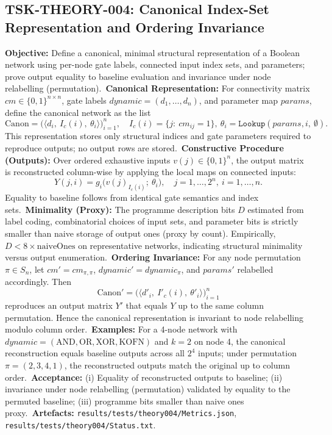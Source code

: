 \documentclass{article}
\begin{document}
\subsection{TSK-THEORY-004: Canonical Index-Set Representation and Ordering Invariance}
\textbf{Objective:} Define a canonical, minimal structural representation of a Boolean network using per-node gate labels, connected input index sets, and parameters; prove output equality to baseline evaluation and invariance under node relabelling (permutation).\
\textbf{Canonical Representation:} For connectivity matrix \(cm\in\{0,1\}^{n\times n}\), gate labels \(dynamic=(d_1,\dots,d_n)\), and parameter map \(params\), define the canonical network as the list
\[
\mathrm{Canon} = \big( \langle d_i,\ I_c(i),\ \theta_i \rangle \big)_{i=1}^{n},\quad I_c(i)=\{j:\ cm_{ij}=1\},\ \theta_i=\texttt{Lookup}(params,i,\ \emptyset).
\]
This representation stores only structural indices and gate parameters required to reproduce outputs; no output rows are stored.\
\textbf{Constructive Procedure (Outputs):} Over ordered exhaustive inputs \(v(j)\in\{0,1\}^n\), the output matrix is reconstructed column-wise by applying the local maps on connected inputs:
\[
Y(j,i) = g_i\big( v(j)_{I_c(i)};\ \theta_i \big),\quad j=1,\dots,2^n,\ i=1,\dots,n.
\]
Equality to baseline follows from identical gate semantics and index sets.\
\textbf{Minimality (Proxy):} The programme description bits \(D\) estimated from label coding, combinatorial choices of input sets, and parameter bits is strictly smaller than naive storage of output ones (proxy by count). Empirically, \(D<8\times \text{naiveOnes}\) on representative networks, indicating structural minimality versus output enumeration.\
\textbf{Ordering Invariance:} For any node permutation \(\pi\in S_n\), let \(cm' = cm_{\pi,\pi}\), \(dynamic' = dynamic_{\pi}\), and \(params'\) relabelled accordingly. Then
\[
\mathrm{Canon}' = \big( \langle d'_{i},\ I'_c(i),\ \theta'_{i} \rangle \big)_{i=1}^{n}
\]
reproduces an output matrix \(Y'\) that equals \(Y\) up to the same column permutation. Hence the canonical representation is invariant to node relabelling modulo column order.\
\textbf{Examples:} For a 4-node network with \(dynamic=(\mathrm{AND},\mathrm{OR},\mathrm{XOR},\mathrm{KOFN})\) and \(k=2\) on node 4, the canonical reconstruction equals baseline outputs across all \(2^4\) inputs; under permutation \(\pi=(2,3,4,1)\), the reconstructed outputs match the original up to column order.\
\textbf{Acceptance:} (i) Equality of reconstructed outputs to baseline; (ii) invariance under node relabelling (permutation) validated by equality to the permuted baseline; (iii) programme bits smaller than naive ones proxy.\
\textbf{Artefacts:} \texttt{results/tests/theory004/Metrics.json}, \texttt{results/tests/theory004/Status.txt}.\
\end{document}
